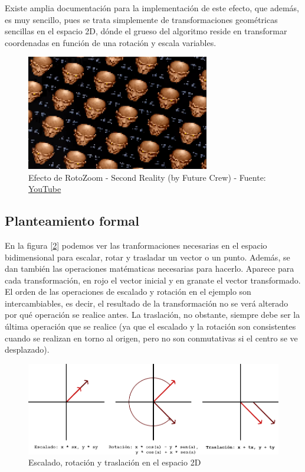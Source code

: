 Existe amplia documentación para la implementación de este efecto, que además, es muy sencillo, pues se trata simplemente de transformaciones geométricas sencillas en el espacio 2D, dónde el grueso del algoritmo reside en transformar coordenadas en función de una rotación y escala variables.\\

\begin{figure}[h]
	\centering
	\includegraphics[width=8cm]{archivos/second-reality-rotozoom}
	\caption{Efecto de RotoZoom - Second Reality (by Future Crew) - Fuente: \href{https://www.youtube.com/watch?v=rFv7mHTf0nA&t=5m6s}{YouTube}}
	\label{fig:second-reality-rotozoom}
\end{figure}

\subsection{Planteamiento formal}

En la figura [\ref{fig:transform}] podemos ver las tranformaciones necesarias en el espacio bidimensional para escalar, rotar y trasladar un vector o un punto. Además, se dan también las operaciones matématicas necesarias para hacerlo. Aparece para cada transformación, en rojo el vector inicial y en granate el vector transformado. El orden de las operaciones de escalado y rotación en el ejemplo son intercambiables, es decir, el resultado de la transformación no se verá alterado por qué operación se realice antes. La traslación, no obstante, siempre debe ser la última operación que se realice (ya que el escalado y la rotación son consistentes cuando se realizan en torno al origen, pero no son conmutativas si el centro se ve desplazado).\\

\begin{figure}[h]
	\centering
	\includegraphics[width=14cm]{archivos/transform}
	\caption{Escalado, rotación y traslación en el espacio 2D}
	\label{fig:transform}
\end{figure}

